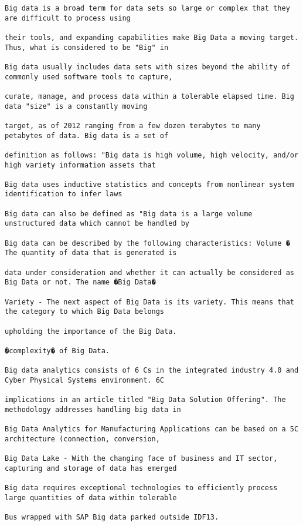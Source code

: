 \documentclass[11pt]{article}
\begin{document}
\begin{verbatim}
Big data is a broad term for data sets so large or complex that they are difficult to process using

their tools, and expanding capabilities make Big Data a moving target. Thus, what is considered to be "Big" in

Big data usually includes data sets with sizes beyond the ability of commonly used software tools to capture,

curate, manage, and process data within a tolerable elapsed time. Big data "size" is a constantly moving

target, as of 2012 ranging from a few dozen terabytes to many petabytes of data. Big data is a set of

definition as follows: "Big data is high volume, high velocity, and/or high variety information assets that

Big data uses inductive statistics and concepts from nonlinear system identification to infer laws

Big data can also be defined as "Big data is a large volume unstructured data which cannot be handled by

Big data can be described by the following characteristics: Volume � The quantity of data that is generated is

data under consideration and whether it can actually be considered as Big Data or not. The name �Big Data�

Variety - The next aspect of Big Data is its variety. This means that the category to which Big Data belongs

upholding the importance of the Big Data.

�complexity� of Big Data.

Big data analytics consists of 6 Cs in the integrated industry 4.0 and Cyber Physical Systems environment. 6C

implications in an article titled "Big Data Solution Offering". The methodology addresses handling big data in

Big Data Analytics for Manufacturing Applications can be based on a 5C architecture (connection, conversion,

Big Data Lake - With the changing face of business and IT sector, capturing and storage of data has emerged

Big data requires exceptional technologies to efficiently process large quantities of data within tolerable

Bus wrapped with SAP Big data parked outside IDF13.


\end{verbatim}
\end{document}

